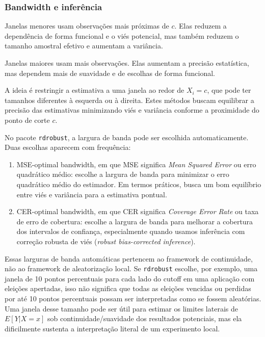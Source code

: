\documentclass[
]{article}
\begin{document}
\subsubsection{Bandwidth e inferência}\label{bandwidth-e-inferuxeancia}

Janelas menores usam observações mais próximas de \(c\). Elas reduzem a dependência de forma funcional e o viés potencial, mas também reduzem o tamanho amostral efetivo e aumentam a variância.

Janelas maiores usam mais observações. Elas aumentam a precisão estatística, mas dependem mais de suavidade e de escolhas de forma funcional.

A ideia é restringir a estimativa a uma janela ao redor de \(X_i = c\), que pode ter tamanhos diferentes à esquerda ou à direita. Estes métodos buscam equilibrar a precisão das estimativas minimizando viés e variância conforme a proximidade do ponto de corte \(c\).

No pacote \texttt{rdrobust}, a largura de banda pode ser escolhida automaticamente. Duas escolhas aparecem com frequência:

\begin{enumerate}
\def\labelenumi{\arabic{enumi}.}
\item
  MSE-optimal bandwidth, em que MSE significa \emph{Mean Squared Error} ou erro quadrático médio: escolhe a largura de banda para minimizar o erro quadrático médio do estimador. Em termos práticos, busca um bom equilíbrio entre viés e variância para a estimativa pontual.
\item
  CER-optimal bandwidth, em que CER significa \emph{Coverage Error Rate} ou taxa de erro de cobertura: escolhe a largura de banda para melhorar a cobertura dos intervalos de confiança, especialmente quando usamos inferência com correção robusta de viés (\emph{robust bias-corrected inference}).
\end{enumerate}

Essas larguras de banda automáticas pertencem ao framework de continuidade, não ao framework de aleatorização local. Se \texttt{rdrobust} escolhe, por exemplo, uma janela de 10 pontos percentuais para cada lado do cutoff em uma aplicação com eleições apertadas, isso não significa que todas as eleições vencidas ou perdidas por até 10 pontos percentuais possam ser interpretadas como se fossem aleatórias. Uma janela desse tamanho pode ser útil para estimar os limites laterais de \(E[Y|X=x]\) sob continuidade/suavidade dos resultados potenciais, mas ela dificilmente sustenta a interpretação literal de um experimento local.
\end{document}
